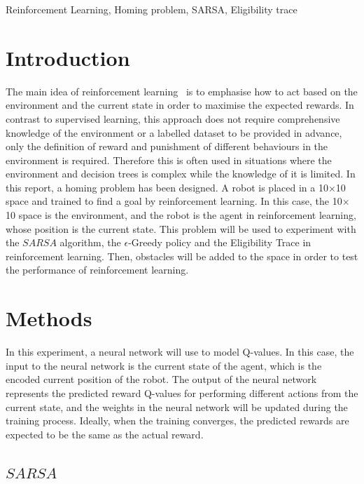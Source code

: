 \documentclass[conference]{IEEEtran}
\begin{document}
\begin{IEEEkeywords}
    Reinforcement Learning, Homing problem, SARSA, Eligibility trace
\end{IEEEkeywords}

\section{Introduction}

The main idea of reinforcement learning~\cite{richard2018rl} is to emphasise how to act based on the environment and the current state in order to maximise the expected rewards. In contrast to supervised learning, this approach does not require comprehensive knowledge of the environment or a labelled dataset to be provided in advance, only the definition of reward and punishment of different behaviours in the environment is required. Therefore this is often used in situations where the environment and decision trees is complex while the knowledge of it is limited. In this report, a homing problem has been designed. A robot is placed in a 10\({\times}\)10 space and trained to find a goal by reinforcement learning. In this case, the 10\({\times}\)10 space is the environment, and the robot is the agent in reinforcement learning, whose position is the current state. This problem will be used to experiment with the \(SARSA\) algorithm, the \({\epsilon}\)-Greedy policy and the Eligibility Trace in reinforcement learning. Then, obstacles will be added to the space in order to test the performance of reinforcement learning.

\section{Methods}

In this experiment, a neural network will use to model Q-values. In this case, the input to the neural network is the current state of the agent, which is the encoded current position of the robot. The output of the neural network represents the predicted reward Q-values for performing different actions from the current state, and the weights in the neural network will be updated during the training process. Ideally, when the training converges, the predicted rewards are expected to be the same as the actual reward.

\subsection{\(SARSA\)}
\end{document}
